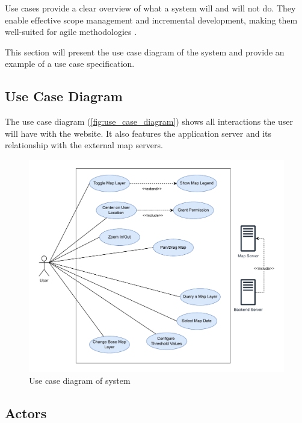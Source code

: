 Use cases provide a clear overview of what a system will and will not do. They enable effective scope management and incremental development, making them well-suited for agile methodologies \cite{jacobson_use_case}. 

This section will present the use case diagram of the system and provide an example of a use case specification.

\subsection{Use Case Diagram}
The use case diagram (\autoref{fig:use_case_diagram}) shows all interactions the user will have with the website. It also features the application server and its relationship with the external map servers.



\begin{figure}[h]
    \centering
    \includegraphics[width=1\linewidth]{figures/skogkurs_use_case.pdf}
    \caption{Use case diagram of system}
    \label{fig:use_case_diagram}
\end{figure}

\subsection{Actors}


